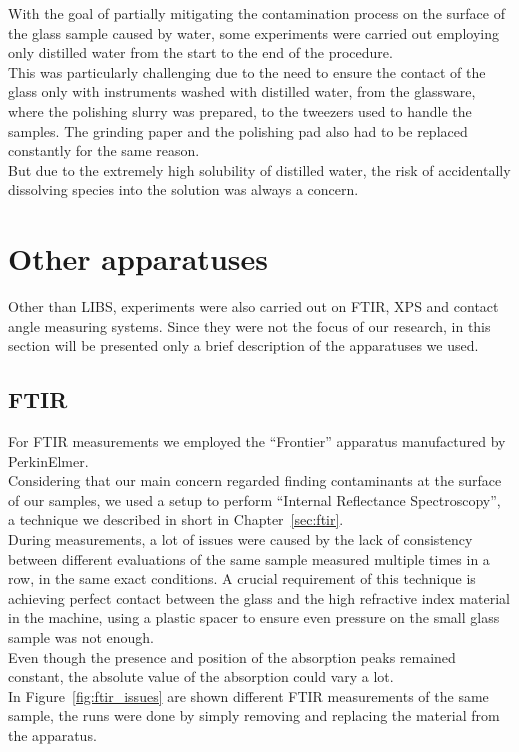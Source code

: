 With the goal of partially mitigating the contamination process on the surface of the glass sample caused by water, some experiments were carried out employing only distilled water from the start to the end of the procedure.
\\
This was particularly challenging due to the need to ensure the contact of the glass only with instruments washed with distilled water, from the glassware, where the polishing slurry was prepared, to the tweezers used to handle the samples. The grinding paper and the polishing pad also had to be replaced constantly for the same reason.
\\
But due to the extremely high solubility of distilled water, the risk of accidentally dissolving species into the solution was always a concern.

\section{Other apparatuses}
\label{sec:other_apparatuses}
Other than LIBS, experiments were also carried out on FTIR, XPS and contact angle measuring systems. Since they were not the focus of our research, in this section will be presented only a brief description of the apparatuses we used.

\subsection{FTIR}
\label{subsec:ftir_setup}
For FTIR measurements we employed the “Frontier” apparatus manufactured by PerkinElmer.
\\
Considering that our main concern regarded finding contaminants at the surface of our samples, we used a setup to perform “Internal Reflectance Spectroscopy”, a technique we described in short in Chapter~\ref{sec:ftir}.
\\
During measurements, a lot of issues were caused by the lack of consistency between different evaluations of the same sample measured multiple times in a row, in the same exact conditions. A crucial requirement of this technique is achieving perfect contact between the glass and the high refractive index material in the machine, using a plastic spacer to ensure even pressure on the small glass sample was not enough.
\\
Even though the presence and position of the absorption peaks remained constant, the absolute value of the absorption could vary a lot.
\\
In Figure~\ref{fig:ftir_issues} are shown different FTIR measurements of the same sample, the runs were done by simply removing and replacing the material from the apparatus.

